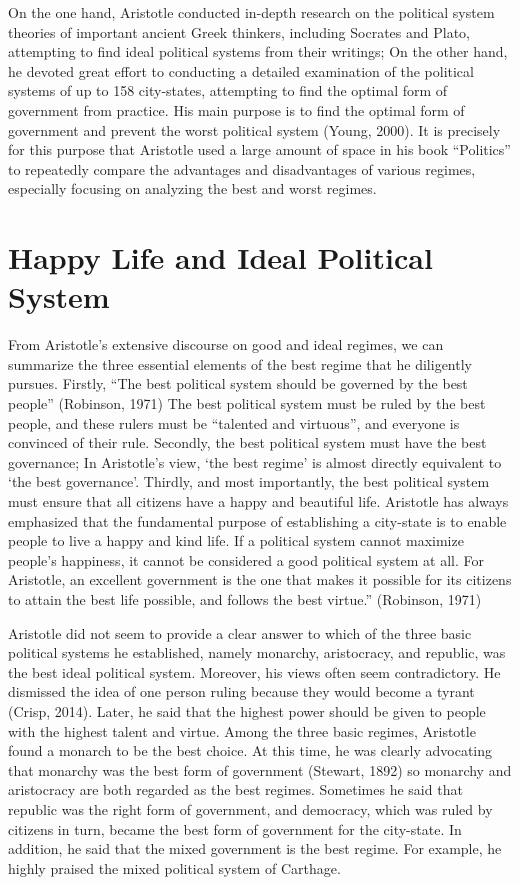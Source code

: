 \documentclass[11pt]{article}
\begin{document}
On the one hand, Aristotle conducted in-depth research on the political system theories of important ancient Greek thinkers, including Socrates and Plato, attempting to find ideal political systems from their writings; On the other hand, he devoted great effort to conducting a detailed examination of the political systems of up to 158 city-states, attempting to find the optimal form of government from practice. His main purpose is to find the optimal form of government and prevent the worst political system (Young, 2000). It is precisely for this purpose that Aristotle used a large amount of space in his book “Politics” to repeatedly compare the advantages and disadvantages of various regimes, especially focusing on analyzing the best and worst regimes.

\section{Happy Life and Ideal Political System}

From Aristotle's extensive discourse on good and ideal regimes, we can summarize the three essential elements of the best regime that he diligently pursues. Firstly, “The best political system should be governed by the best people” (Robinson, 1971) The best political system must be ruled by the best people, and these rulers must be “talented and virtuous”, and everyone is convinced of their rule. Secondly, the best political system must have the best governance; In Aristotle's view, ‘the best regime' is almost directly equivalent to ‘the best governance'. Thirdly, and most importantly, the best political system must ensure that all citizens have a happy and beautiful life. Aristotle has always emphasized that the fundamental purpose of establishing a city-state is to enable people to live a happy and kind life. If a political system cannot maximize people's happiness, it cannot be considered a good political system at all. For Aristotle, an excellent government is the one that makes it possible for its citizens to attain the best life possible, and follows the best virtue.” (Robinson, 1971)

Aristotle did not seem to provide a clear answer to which of the three basic political systems he established, namely monarchy, aristocracy, and republic, was the best ideal political system. Moreover, his views often seem contradictory. He dismissed the idea of one person ruling because they would become a tyrant (Crisp, 2014). Later, he said that the highest power should be given to people with the highest talent and virtue. Among the three basic regimes, Aristotle found a monarch to be the best choice. At this time, he was clearly advocating that monarchy was the best form of government (Stewart, 1892) so monarchy and aristocracy are both regarded as the best regimes. Sometimes he said that republic was the right form of government, and democracy, which was ruled by citizens in turn, became the best form of government for the city-state. In addition, he said that the mixed government is the best regime. For example, he highly praised the mixed political system of Carthage.
\end{document}
